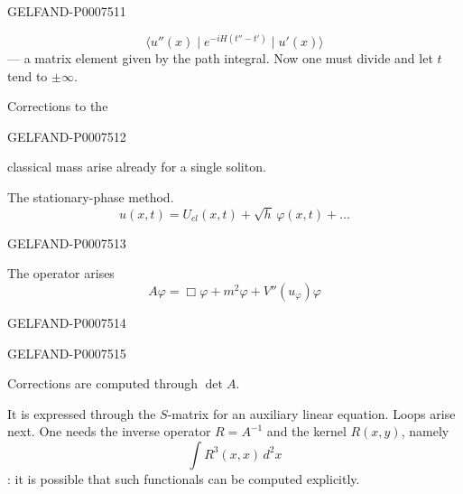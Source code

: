 \begin{GelfandAdjacentEvidence}{GELFAND-P000751}{1}

\begin{equation*}
\langle u''(x)\mid e^{-iH(t''-t')}\mid u'(x)\rangle
\tag{38}
\end{equation*}
--- a matrix element given by the path integral. Now one must divide and let \(t\) tend to \(\pm\infty\).

Corrections to the
\end{GelfandAdjacentEvidence}
\begin{GelfandAdjacentEvidence}{GELFAND-P000751}{2}

classical mass arise already for a single soliton.


The stationary-phase method.
\begin{equation*}
u(x,t)=U_{cl}(x,t)+\sqrt h\,\varphi(x,t)+\ldots
\tag{39}
\end{equation*}
\end{GelfandAdjacentEvidence}
\begin{GelfandAdjacentEvidence}{GELFAND-P000751}{3}

The operator arises
\begin{equation*}
A\varphi=\Box\varphi+m^2\varphi+V''(u_\varphi)\varphi
\tag{40}
\end{equation*}
\end{GelfandAdjacentEvidence}
\begin{GelfandAdjacentEvidence}{GELFAND-P000751}{4}

\end{GelfandAdjacentEvidence}
\begin{GelfandAdjacentEvidence}{GELFAND-P000751}{5}

Corrections are computed through \(\det A\).

It is expressed through the \(S\)-matrix for an auxiliary linear equation. Loops arise next.
One needs the inverse operator \(R=A^{-1}\) and the kernel \underline{\(R(x,y)\)}, namely
\begin{equation*}
\int R^3(x,x)\,d^2x
\tag{41}
\end{equation*}
: it is possible that such functionals can be computed explicitly.
\end{GelfandAdjacentEvidence}
